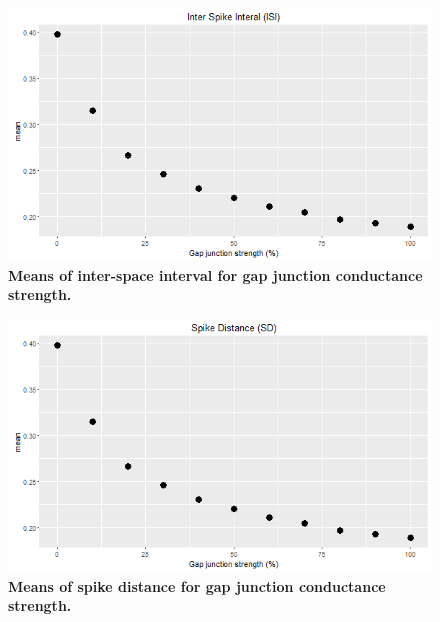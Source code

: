 \begin{figure}[H]
	\begin{center}
		\includegraphics[width=14cm]{graphics/NewISImean.png}
		\caption[Means of inter-space interval for gap junction conductance strength.]{\textbf{Means of inter-space interval for gap junction conductance strength.}}
		\label{fig:means_ISI}
	\end{center}
\end{figure}
\begin{figure}[H]
	\begin{center}
		\includegraphics[width=14cm]{graphics/NewSDmean.png}
		\caption[Means of spike distance for gap junction conductance strength.]{\textbf{Means of spike distance for gap junction conductance strength.}}
		\label{fig:means_SD}
	\end{center}
\end{figure}

